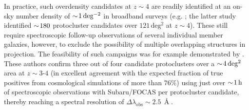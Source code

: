 In practice, such overdensity candidates at $z \sim 4$ are readily identified at an on-sky number density of $\sim \! 1 \, \mathrm{deg^{-2}}$ in broadband surveys (e.g. \citealt{2016ApJ...826..114T, 2018PASJ...70S..12T}; the latter study identified $\sim \! 180$ protocluster candidates over $121 \, \mathrm{deg^2}$ at $z \sim 4$). These still require spectroscopic follow-up observations of several individual member galaxies, however, to exclude the possibility of multiple overlapping structures in projection. The feasibility of such campaigns was for example demonstrated by \citet{2016ApJ...826..114T}. These authors confirm three out of four candidate protoclusters over a $\sim \! 4 \, \mathrm{deg^2}$ area at $z \sim 3$-$4$ (in excellent agreement with the expected fraction of true positives from cosmological simulations of more than $76\%$) using just over $\sim \! 1 \, \mathrm{h}$ of spectroscopic observations with Subaru/FOCAS per protocluster candidate, thereby reaching a spectral resolution of $\Delta \lambda_\text{obs} \sim 2.5 \, \Angstrom$.


